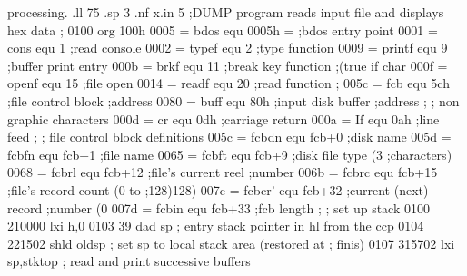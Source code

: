 processing.
.ll 75
.sp 3
.nf
x.in 5
                            ;DUMP program reads input file and displays
                            hex data
                            ;
0100                                 org  100h
0005 =                      bdos     equ  0005h =   ;bdos entry point
0001 =                      cons     equ  1         ;read console
0002 =                      typef    equ  2         ;type function
0009 =                      printf   equ  9         ;buffer print entry
000b =                      brkf     equ  11        ;break key function
                                                    ;(true if char
000f =                      openf    equ  15        ;file open
0014 =                      readf    equ  20        ;read function
                            ;
005c =                      fcb      equ  5ch       ;file control block
                                                    ;address
0080 =                      buff     equ  80h       ;input disk buffer
                                                    ;address
                            ;
                            ;        non graphic characters
000d =                      cr       equ  0dh       ;carriage return
000a =                      If       equ  0ah       ;line feed
                            ;
                            ;        file control block definitions
005c =                      fcbdn    equ  fcb+0     ;disk name
005d =                      fcbfn    equ  fcb+1     ;file name
0065 =                      fcbft    equ  fcb+9     ;disk file type (3
                                                    ;characters)
0068 =                      fcbrl    equ  fcb+12    ;file's current reel
                                                    ;number
006b =                      fcbrc    equ  fcb+15    ;file's record count (0 to
                                                    ;128)128)
007c =                      fcbcr'   equ  fcb+32    ;current (next) record
                                                    ;number (0
007d =                      fcbin    equ  fcb+33    ;fcb length
                            ;
                            ;        set up stack
0100 210000                          lxi  h,0
0103 39                              dad  sp
                            ;        entry stack pointer in hl from the ccp
0104 221502                          shld oldsp
                            ;        set sp to local stack area (restored at
                            ;        finis)
0107 315702                          lxi  sp,stktop
                            ;        read and print successive buffers
